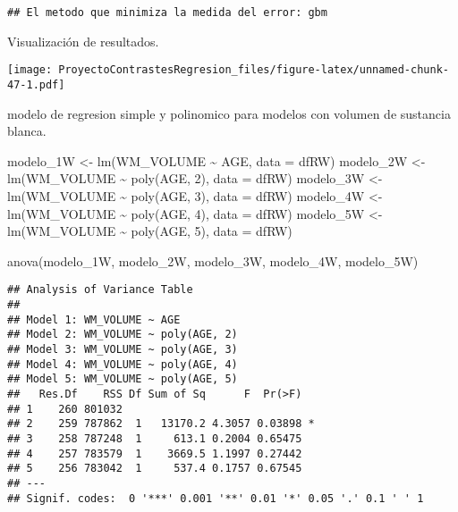\documentclass[
]{article}
\newenvironment{Shaded}{\begin{snugshade}}{\end{snugshade}}
\newcommand{\AttributeTok}[1]{\textcolor[rgb]{0.77,0.63,0.00}{#1}}
\newcommand{\DecValTok}[1]{\textcolor[rgb]{0.00,0.00,0.81}{#1}}
\newcommand{\FunctionTok}[1]{\textcolor[rgb]{0.00,0.00,0.00}{#1}}
\newcommand{\NormalTok}[1]{#1}
\newcommand{\OtherTok}[1]{\textcolor[rgb]{0.56,0.35,0.01}{#1}}
\newcommand{\SpecialCharTok}[1]{\textcolor[rgb]{0.00,0.00,0.00}{#1}}
\begin{document}
\begin{verbatim}
## El metodo que minimiza la medida del error: gbm
\end{verbatim}

Visualización de resultados.

\begin{Shaded}
\end{Shaded}

\texttt{[image: ProyectoContrastesRegresion\_files/figure-latex/unnamed-chunk-47-1.pdf]}

modelo de regresion simple y polinomico para modelos con volumen de
sustancia blanca.

\begin{Shaded}
\begin{Highlighting}[]
\NormalTok{modelo\_1W }\OtherTok{\textless{}{-}} \FunctionTok{lm}\NormalTok{(WM\_VOLUME }\SpecialCharTok{\textasciitilde{}}\NormalTok{ AGE, }\AttributeTok{data =}\NormalTok{ dfRW)}
\NormalTok{modelo\_2W }\OtherTok{\textless{}{-}} \FunctionTok{lm}\NormalTok{(WM\_VOLUME }\SpecialCharTok{\textasciitilde{}} \FunctionTok{poly}\NormalTok{(AGE, }\DecValTok{2}\NormalTok{), }\AttributeTok{data =}\NormalTok{ dfRW)}
\NormalTok{modelo\_3W }\OtherTok{\textless{}{-}} \FunctionTok{lm}\NormalTok{(WM\_VOLUME }\SpecialCharTok{\textasciitilde{}} \FunctionTok{poly}\NormalTok{(AGE, }\DecValTok{3}\NormalTok{), }\AttributeTok{data =}\NormalTok{ dfRW)}
\NormalTok{modelo\_4W }\OtherTok{\textless{}{-}} \FunctionTok{lm}\NormalTok{(WM\_VOLUME }\SpecialCharTok{\textasciitilde{}} \FunctionTok{poly}\NormalTok{(AGE, }\DecValTok{4}\NormalTok{), }\AttributeTok{data =}\NormalTok{ dfRW)}
\NormalTok{modelo\_5W }\OtherTok{\textless{}{-}} \FunctionTok{lm}\NormalTok{(WM\_VOLUME }\SpecialCharTok{\textasciitilde{}} \FunctionTok{poly}\NormalTok{(AGE, }\DecValTok{5}\NormalTok{), }\AttributeTok{data =}\NormalTok{ dfRW)}

\FunctionTok{anova}\NormalTok{(modelo\_1W, modelo\_2W, modelo\_3W, modelo\_4W, modelo\_5W)}
\end{Highlighting}
\end{Shaded}

\begin{verbatim}
## Analysis of Variance Table
## 
## Model 1: WM_VOLUME ~ AGE
## Model 2: WM_VOLUME ~ poly(AGE, 2)
## Model 3: WM_VOLUME ~ poly(AGE, 3)
## Model 4: WM_VOLUME ~ poly(AGE, 4)
## Model 5: WM_VOLUME ~ poly(AGE, 5)
##   Res.Df    RSS Df Sum of Sq      F  Pr(>F)  
## 1    260 801032                              
## 2    259 787862  1   13170.2 4.3057 0.03898 *
## 3    258 787248  1     613.1 0.2004 0.65475  
## 4    257 783579  1    3669.5 1.1997 0.27442  
## 5    256 783042  1     537.4 0.1757 0.67545  
## ---
## Signif. codes:  0 '***' 0.001 '**' 0.01 '*' 0.05 '.' 0.1 ' ' 1
\end{verbatim}
\end{document}
